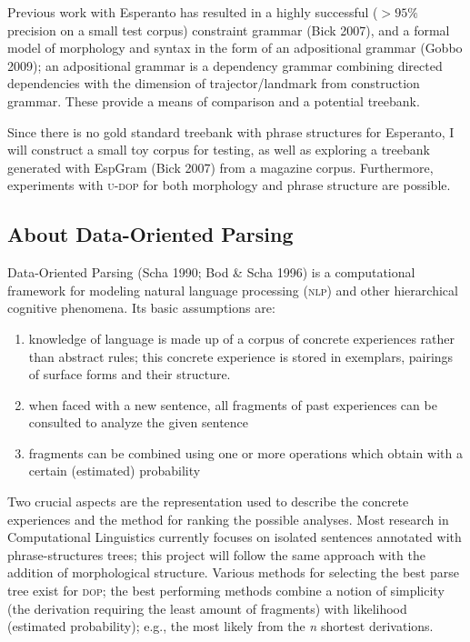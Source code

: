 \documentclass[10pt,a4paper]{article}
\begin{document}
Previous work with Esperanto has resulted in a highly successful
($>95\%$ precision on a small test corpus) constraint grammar (Bick 2007), and
a formal model of morphology and syntax in the form of an adpositional grammar
(Gobbo 2009); an adpositional grammar is a dependency grammar combining
directed dependencies with the dimension of trajector/landmark from
construction grammar. These provide a means of comparison and a potential
treebank.

Since there is no gold standard treebank with phrase structures for Esperanto,
I will construct a small toy corpus for testing, as well as exploring a
treebank generated with EspGram (Bick 2007) from a magazine corpus. Furthermore,
experiments with \textsc{u-dop} for both morphology and phrase structure are possible.

\subsection{About Data-Oriented Parsing}

Data-Oriented Parsing (Scha 1990; Bod \& Scha 1996) is a
computational framework for modeling natural language processing (\textsc{nlp}) and
other hierarchical cognitive phenomena. Its basic assumptions are:

\begin{enumerate}
\item knowledge of language is made up of a corpus of concrete experiences
rather than abstract rules; this concrete experience is stored in
exemplars, pairings of surface forms and their structure.
\item when faced with a new sentence, all fragments of past experiences can be
consulted to analyze the given sentence
\item fragments can be combined using one or more operations which obtain with a
certain (estimated) probability
\end{enumerate}

Two crucial aspects are the representation used to describe the concrete
experiences and the method for ranking the possible analyses. Most research in
Computational Linguistics currently focuses on isolated sentences annotated
with phrase-structures trees; this project will follow the same approach with
the addition of morphological structure. Various methods for selecting the best
parse tree exist for \textsc{dop}; the best performing methods combine a notion of
simplicity (the derivation requiring the least amount of fragments) with
likelihood (estimated probability); e.g., the most likely from the {\em n} shortest
derivations.
\end{document}
